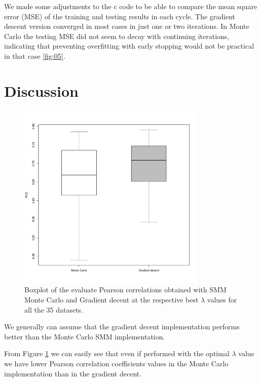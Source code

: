 \documentclass{bioinfo}
\begin{document}
\begin{application}
\par We made some adjustments to the c code to be able to compare the mean square error (MSE) of the training and testing results in each cycle. The gradient descent version converged in most cases in just one or two iterations. In Monte Carlo the testing MSE did not seem to decay with continuing iterations, indicating that preventing overfitting with early stopping would not be practical in that case \ref{fig:05}.



\section*{Discussion}



\begin{figure}[!tpb]
\centerline{\includegraphics[width=9cm]{fig/boxplot.pdf}}
\caption{Boxplot of the evaluate Pearson correlations obtained with SMM Monte Carlo and Gradient decent at the respective best $\lambda$ values for all the 35 datasets.}
\label{fig:06}
\end{figure}




\par We generally can assume that the gradient decent implementation performs better than the Monte Carlo SMM implementation. 
\par From Figure \ref{fig:06} we can easily see that even if performed with the optimal $\lambda$ value we have lower Pearson correlation coefficients values in the Monte Carlo implementation than in the gradient decent.







%
%
%
%
%






\end{application}
\end{document}
